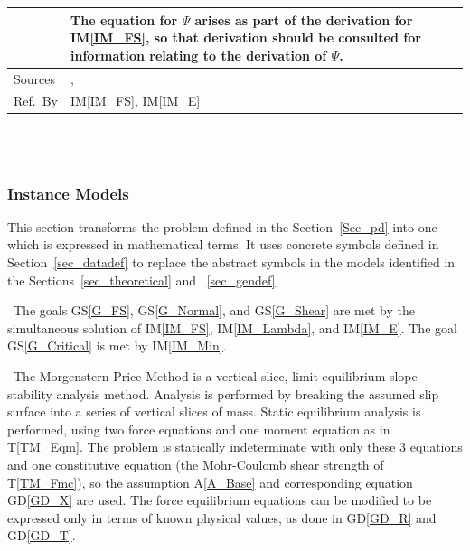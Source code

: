 \documentclass[12pt]{article}
\newcommand{\colAwidth}{0.13\textwidth}
\newcommand{\colBwidth}{0.82\textwidth}
\newcommand{\aref}[1]{A\ref{#1}}
\newcommand{\gsref}[1]{GS\ref{#1}}
\newcommand{\tref}[1]{T\ref{#1}}
\newcommand{\iref}[1]{IM\ref{#1}}
\newcommand{\dref}[1]{GD\ref{#1}}
\begin{document}
\begin{minipage}{\textwidth}
\begin{tabular}{| p{\colAwidth} | p{\colBwidth} |}
		&The equation for $\Psi$ arises as part of the derivation for 
		\iref{IM_FS}, so that derivation should be consulted for information 
		relating to the derivation of $\Psi$.\\
		
		\hline Sources& \cite{ZhuEtAl2005}, \cite{Karchewski2012}\\
		
		\hline Ref.\ By & \iref{IM_FS}, \iref{IM_E}\\
		
		\hline
	\end{tabular}
\end{minipage}\\


~\newline

\subsubsection{Instance Models} \label{sec_instance}

This section transforms the problem defined in the
Section~\ref{Sec_pd} into one which is expressed in mathematical
terms. It uses concrete symbols defined in Section~\ref{sec_datadef}
to replace the abstract symbols in the models identified in the
Sections~\ref{sec_theoretical} and ~\ref{sec_gendef}.

~\newline\noindent The goals \gsref{G_FS}, \gsref{G_Normal}, and 
\gsref{G_Shear} are met by the simultaneous solution of \iref{IM_FS}, 
\iref{IM_Lambda}, and \iref{IM_E}. The goal \gsref{G_Critical} is met by
\iref{IM_Min}.

~\newline\noindent The Morgenstern-Price Method is a vertical slice,
limit equilibrium slope stability analysis method. Analysis is
performed by breaking the assumed slip surface into a series of
vertical slices of mass. Static equilibrium analysis is performed, using two 
force equations and one moment equation as in \tref{TM_Eqm}. The problem
is statically indeterminate with only these 3 equations and one
constitutive equation (the Mohr-Coulomb shear strength of
\tref{TM_Fmc}), so the assumption \aref{A_Base} and corresponding equation 
\dref{GD_X} are used. The force equilibrium equations can be modified to be 
expressed only in terms of known physical values, as done in \dref{GD_R} and 
\dref{GD_T}.
\end{document}
